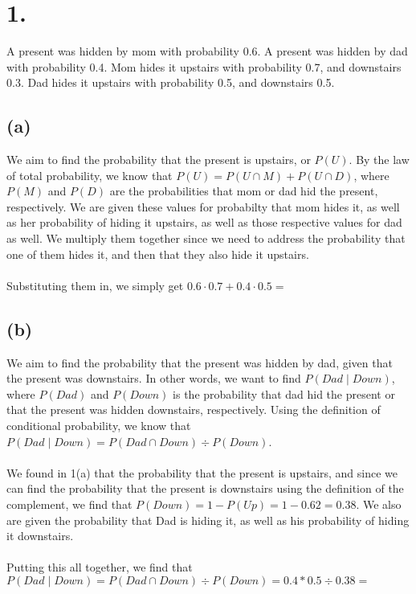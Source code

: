 \documentclass{article}
\begin{document}
\thispagestyle{firstpageheader}

\section*{1.}
{\Large 
A present was hidden by mom with probability 0.6.
A present was hidden by dad with probability 0.4.
Mom hides it upstairs with probability 0.7, and downstairs 0.3.
Dad hides it upstairs with probability 0.5, and downstairs 0.5.

\subsection*{(a)}
We aim to find the probability that the present is upstairs, or $P(U)$. By the law of total probability, we know that $P(U)= P(U \cap M) + P(U \cap D)$, where $P(M)$ and $P(D)$ are the probabilities that mom or dad hid the present, respectively. We are given these values for probabilty that mom hides it, as well as her probability of hiding it upstairs, as well as those respective values for dad as well. We multiply them together since we need to address the probability that one of them hides it, and then that they also hide it upstairs. \\ \\
Substituting them in, we simply get $0.6 \cdot 0.7 + 0.4 \cdot 0.5 =$ 

\subsection*{(b)}
We aim to find the probability that the present was hidden by dad, given that the present was downstairs. In other words, we want to find $P(Dad \mid Down)$, where $P(Dad)$ and $P(Down)$ is the probability that dad hid the present or that the present was hidden downstairs, respectively. Using the definition of conditional probability, we know that $P(Dad \mid Down) = P(Dad \cap Down) \div P(Down)$.  \\ \\
We found in 1(a) that the probability that the present is upstairs, and since we can find the probability that the present is downstairs using the definition of the complement, we find that $P(Down) = 1 - P(Up) = 1 - 0.62 = 0.38$. We also are given the probability that Dad is hiding it, as well as his probability of hiding it downstairs. \\ \\ 
Putting this all together, we find that $P(Dad \mid Down) = P(Dad \cap Down) \div P(Down) = 0.4 * 0.5 \div 0.38 = $ 

}
\end{document}
